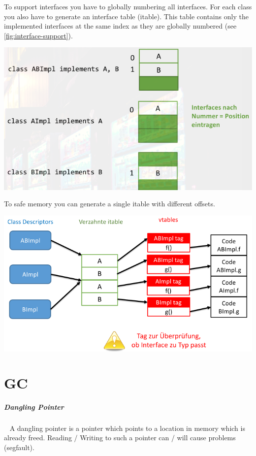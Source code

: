\documentclass[11pt,twoside,landscape]{article}
\begin{document}
\begin{multicols}{3}
To support interfaces you have to globally numbering all interfaces.
For each class you also have to generate an interface table (itable).
This table contains only the implemented interfaces at the same index as they are globally numbered (see \autoref{fig:interface-support}).

{
\begin{center}
\includegraphics[width=.9\linewidth]{img/interface_support_2.png}
\end{center}
\label{fig:interface-support}
}

To safe memory you can generate a single itable with different offsets.

{
\begin{center}
\includegraphics[width=.9\linewidth]{img/total_interface_support.png}
\end{center}
\label{fig:total-interface-support}
}

\section{GC}
\label{sec:orgc8dd1bc}
\subparagraph{Dangling Pointer} \
\label{sec:org4c4b0cd}
A dangling pointer is a pointer which points to a location in memory which is already freed.
Reading / Writing to such a pointer can / will cause problems (segfault).


\end{multicols}
\end{document}
